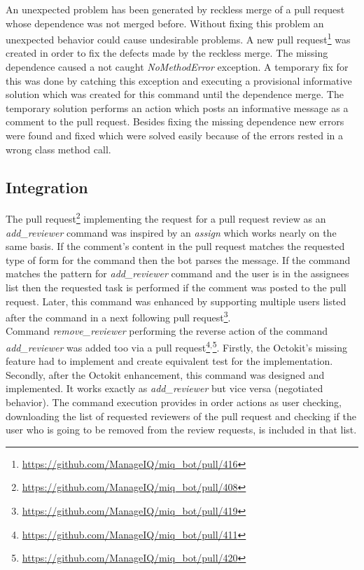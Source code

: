 An unexpected problem has been generated by reckless merge of a pull request whose dependence was not merged before. Without fixing this problem an unexpected behavior could cause undesirable problems. A new pull request\footnote{\url{https://github.com/ManageIQ/miq_bot/pull/416}} was created in order to fix the defects made by the reckless merge. The missing dependence caused a not caught \textit{NoMethodError} exception. A temporary fix for this was done by catching this exception and executing a provisional informative solution which was created for this command until the dependence merge. The temporary solution performs an action which posts an informative message as a comment to the pull request. Besides fixing the missing dependence new errors were found and fixed which were solved easily because of the errors rested in a wrong class method call.

\subsection{Integration}

The pull request\footnote{\url{https://github.com/ManageIQ/miq_bot/pull/408}} implementing the request for a pull request review as an \textit{add\_reviewer} command was inspired by an \textit{assign} which works nearly on the same basis. If the comment's content in the pull request matches the requested type of form for the command then the bot parses the message. If the command matches the pattern for \textit{add\_reviewer} command and the user is in the assignees list then the requested task is performed if the comment was posted to the pull request. Later, this command was enhanced by supporting multiple users listed after the command in a next following pull request\footnote{\url{https://github.com/ManageIQ/miq_bot/pull/419}}.\\

Command \textit{remove\_reviewer} performing the reverse action of the command \textit{add\_reviewer} was added too via a pull request\footnote{\url{https://github.com/ManageIQ/miq_bot/pull/411}}$^{,}$\footnote{\url{https://github.com/ManageIQ/miq_bot/pull/420}}. Firstly, the Octokit's missing feature had to implement and create equivalent test for the implementation. Secondly, after the Octokit enhancement, this command was designed and implemented. It works exactly as \textit{add\_reviewer} but vice versa (negotiated behavior). The command execution provides in order actions as user checking, downloading the list of requested reviewers of the pull request and checking if the user who is going to be removed from the review requests, is included in that list.


